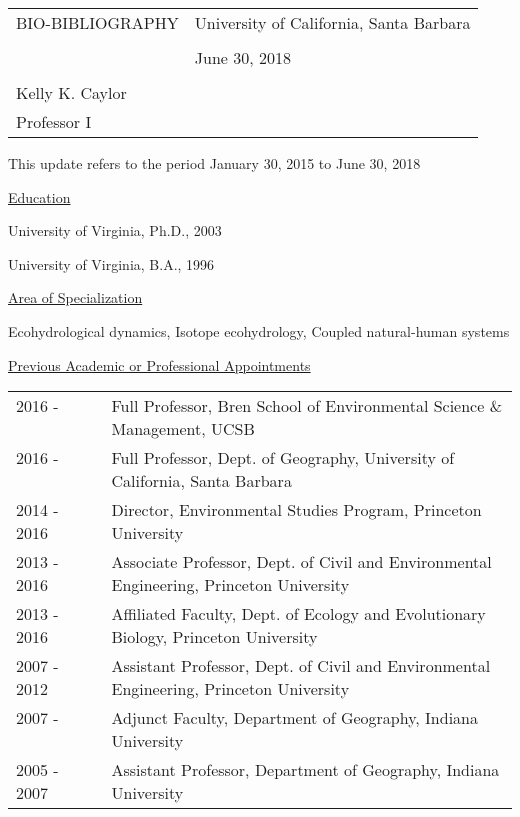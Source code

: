 \documentclass[10pt]{article}
\begin{document}
\noindent
\begin{tabularx}{\linewidth}{XX} 
BIO-BIBLIOGRAPHY & \hfill University of California, Santa Barbara \\ \\
 & \hfill June 30, 2018 \\ \\
 Kelly K. Caylor &   \\ 
 Professor I & 
 \end{tabularx}

\vspace{1cm}

This update refers to the period January 30, 2015 to June 30, 2018

\vspace{1cm}

\raggedright

\vspace{0.5cm}
\underline{Education}

University of Virginia, Ph.D., 2003

University of Virginia, B.A., 1996

\vspace{0.5cm}
\underline{Area of Specialization}

Ecohydrological dynamics, Isotope ecohydrology, Coupled natural-human systems

\vspace{0.5cm}
\underline{Previous Academic or Professional Appointments}
\begin{tabular}{l p{5.5in} }
2016 - \ \ \ \ & Full Professor, Bren School of Environmental Science \& Management, UCSB \\ 
2016 - \ \ \ \ & Full Professor, Dept. of Geography, University of California, Santa Barbara \\ 
2014 - 2016 & Director, Environmental Studies Program, Princeton University \\
2013 - 2016 & Associate Professor, Dept. of Civil and Environmental Engineering, Princeton University \\
2013 - 2016 & Affiliated Faculty, Dept. of Ecology and Evolutionary Biology, Princeton University \\
2007 - 2012 \ \ \ \ & Assistant Professor, Dept. of Civil and Environmental Engineering, Princeton University \\
2007 - \ \ \ \ & Adjunct Faculty, Department of Geography, Indiana University \\ 
2005 - 2007 \ \ \ \  & Assistant Professor, Department of Geography, Indiana University \\
\end{tabular}
\end{document}

